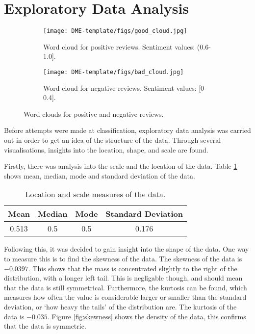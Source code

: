 \documentclass{article}
\begin{document}
\section{Exploratory Data Analysis}
\label{eda}


\begin{figure}[h]
    \centering
    \begin{subfigure}{0.49\textwidth}
        \centering
        \texttt{[image: DME-template/figs/good\_cloud.jpg]}
        \caption{Word cloud for positive reviews. Sentiment values: (0.6-1.0].}
    \end{subfigure}
    \begin{subfigure}{0.49\textwidth}
        \centering
        \texttt{[image: DME-template/figs/bad\_cloud.jpg]}
        \caption{Word cloud for negative reviews. Sentiment values: [0-0.4].}
    \end{subfigure}
    \caption{Word clouds for positive and negative reviews.}
    \label{fig:word_clouds}
\end{figure}

Before attempts were made at classification, exploratory data analysis was carried out in order to get an idea of the structure of the data. Through several visualisations, insights into the location, shape, and scale are found.

Firstly, there was analysis into the scale and the location of the data. Table \ref{tab:loc_scale} shows mean, median, mode and standard deviation of the data.

\begin{table}[h]
    \centering
    \begin{tabular}{c|c|c|c}
         \textbf{Mean} & \textbf{Median} & \textbf{Mode} & \textbf{Standard Deviation}  \\
         \hline
         0.513 & 0.5 & 0.5 & 0.176 \\
    \end{tabular}
    \caption{Location and scale measures of the data.}
    \label{tab:loc_scale}
\end{table}

Following this, it was decided to gain insight into the shape of the data. One way to measure this is to find the skewness of the data. The skewness of the data is $-0.0397$. This shows that the mass is concentrated slightly to the right of the distribution, with a longer left tail. This is negligable though, and should mean that the data is still symmetrical. Furthermore, the kurtosis can be found, which measures how often the value is considerable larger or smaller than the standard deviation, or `how heavy the tails' of the distribution are. The kurtosis of the data is $-0.035$. Figure \ref{fig:skewness} shows the density of the data, this confirms that the data is symmetric.
\end{document}
